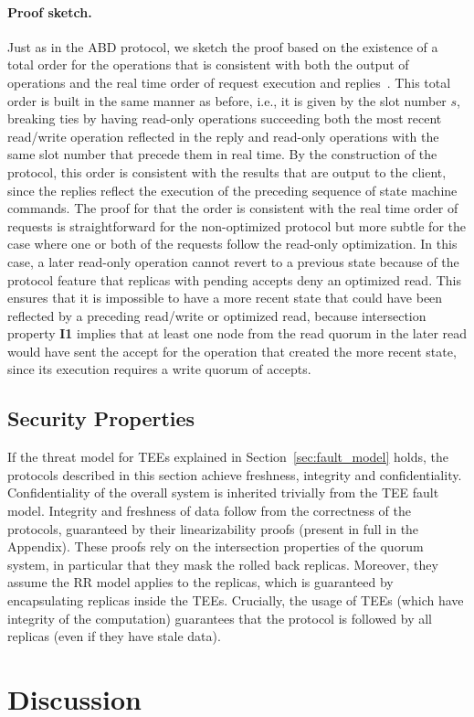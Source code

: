 \paragraph{Proof sketch.}
Just as in the \ac{ABD} protocol, we sketch the proof based on
the existence of a total order for the operations that is
consistent with both the output of operations and the real time
order of request execution and replies~\cite{nancy-book}. This
total order is built in the same manner as before, i.e., it is
given by the slot number $s$, breaking ties by having read-only
operations succeeding both the most recent read/write operation
reflected in the reply and read-only operations with the
same slot number that precede them in real time. By the
construction of the protocol, this order is consistent with the
results that are output to the client, since the replies reflect
the execution of the preceding sequence of state machine commands.
The proof for that the order is consistent with
the real time order of requests is straightforward for the
non-optimized protocol but more subtle for the case where one or
both of the requests follow the read-only optimization.
In this case, a later read-only operation cannot revert to a
previous state because of the protocol feature that replicas with
pending accepts deny an optimized read.  This ensures that
it is impossible to have a more recent state
that could have been reflected by a preceding read/write or
optimized read, because intersection property \textbf{I1} implies
that at least one node from the read quorum in the later read
would have sent the accept for the operation that created the
more recent state, since its execution requires a write quorum of
accepts.


\subsection{Security Properties}\label{ssec:sec_prop}

If the threat model for \acp{TEE} explained in
Section~\ref{sec:fault_model} holds, the protocols described in this
section achieve freshness, integrity and confidentiality.
Confidentiality of the overall system is inherited trivially from the
\ac{TEE} fault model. Integrity and freshness of data follow from the
correctness of the protocols, guaranteed by their linearizability
proofs (present in full in the Appendix). These proofs rely on
the intersection properties of the quorum system, in particular
that they mask the rolled back replicas. Moreover, they assume the
\ac{RR} model applies to the replicas, which is
guaranteed by encapsulating replicas inside the \acp{TEE}. Crucially,
the usage of \acp{TEE} (which have integrity of the computation)
guarantees that the protocol is followed by all replicas (even if
they have stale data).

\section{Discussion}\label{sec:discution}

